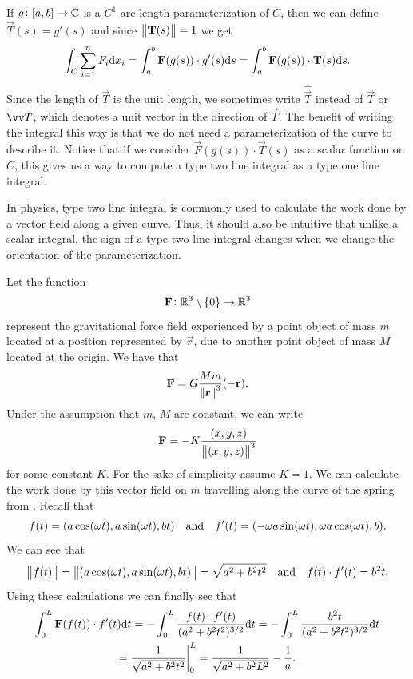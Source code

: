 \documentclass[11pt,a4paper]{article}
\begin{document}
\begin{remark}
  If $g \colon [a,b] \to \mathbb{C}$ is a $C^1$ arc length parameterization of $C$,
  then we can define $\vec T(s) = g'(s)$ and since $\left\lVert\boldsymbol{\mathbf{T}}(s)\right\rVert = 1$
  we get
  \[
    \int_{C} \sum_{i=1}^{n} F_i \dx_i =
    \int_{a}^{b} \vec F(g(s)) \cdot g'(s) \ds =
    \int_{a}^{b} \vec{F}(g(s)) \cdot \vec{T}(s) \ds.
  \]
  Since the length of $\vec T$ is the unit length,
  we sometimes write $\widehat{\vec{T}}$ instead of $\vec T$ or $\vv T$,
  which denotes a unit vector in the direction of $\vec T$.
  The benefit of writing the integral this way is that we do not need
  a parameterization of the curve to describe it.
  Notice that if we consider $\vec F(g(s)) \cdot \vec T(s)$ as a scalar
  function on $C$, this gives us a way to compute a type two line
  integral as a type one line integral.
\end{remark}

\begin{remark}
  In physics, type two line integral is commonly used to calculate the
  work done by a vector field along a given curve.
  Thus, it should also be intuitive that unlike a scalar integral,
  the sign of a type two line integral changes when we change the orientation
  of the parameterization.
\end{remark}

\begin{example}
  \label{exmp:gravitational-field}
  Let the function
  \[
    \boldsymbol{\mathbf{F}} \colon \mathbb{R}^3 \setminus \left\{0\right\} \to \mathbb{R}^3
  \]
  represent the gravitational force field
  experienced by a point object of mass $m$
  located at a position represented by $\vec r$,
  due to another point object of mass $M$ located at the origin.
  We have that
  \[
    \boldsymbol{\mathbf{F}} = G \frac{M m}{\left\lVert\boldsymbol{\mathbf{r}}\right\rVert^3} (- \boldsymbol{\mathbf{r}}).
  \]
  Under the assumption that $m$, $M$ are constant, we can write
  \[
    \boldsymbol{\mathbf{F}} = - K \frac{(x,y,z)}{\left\lVert(x,y,z)\right\rVert^3}
  \]
  for some constant $K$.
  For the sake of simplicity assume $K = 1$.
  We can calculate the work done by this vector field on $m$
  travelling along the curve of the spring
  from .
  Recall that
  \[
    f(t) = (a \cos(\omega t), a \sin(\omega t), bt) \quad \text{and} \quad
    f'(t) = (- \omega a \sin(\omega t), \omega a \cos(\omega t), b).
  \]
  We can see that
  \[
    \left\lVert f(t)\right\rVert =
    \left\lVert(a \cos(\omega t), a \sin(\omega t), bt)\right\rVert =
    \sqrt{a^2 + b^2 t^2} \quad \text{and} \quad
    f(t) \cdot f'(t) = b^2 t.
  \]
  Using these calculations we can finally see that
  \begin{multline*}
    \int_{0}^{L} \boldsymbol{\mathbf{F}}(f(t)) \cdot f'(t) \mathrm{d} t =
    - \int_{0}^{L} \frac{f(t) \cdot f'(t)}{(a^2 + b^2 t^2)^{3/2}} \mathrm{d} t =
    - \int_{0}^{L} \frac{b^2 t}{(a^2 + b^2 t^2)^{3/2}} \mathrm{d} t \\ =
    \frac{1}{\sqrt{a^2 + b^2 t^2}}\biggr\vert_{0}^{L} =
    \frac{1}{\sqrt{a^2 + b^2 L^2}} - \frac{1}{a}.
  \end{multline*}
\end{example}
\end{document}
